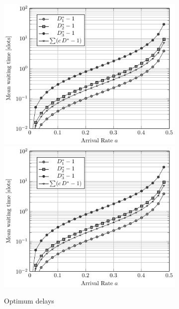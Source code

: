 \begin{figure}
\centering
\begin{subfigure}[t]{.45\textwidth}
  \centering
    \if{}
        \includegraphics[width=\textwidth]{Figures/Ch7_Opt_Delay_equal_a.pdf}
    \else
        \includegraphics[draft,width=\textwidth]{Figures/Ch7_Opt_Delay_equal_a.pdf}
    \fi
    \caption{Optimum delays}
\label{fig:Opt_Delay_equal}
\end{subfigure}%
\begin{subfigure}{.05\textwidth}
\hspace{.05\textwidth}

\end{subfigure}
\end{figure}
